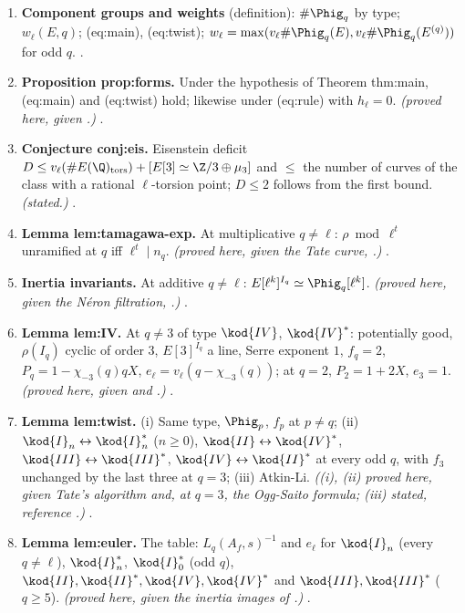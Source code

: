 \begin{sloppypar}
\begin{enumerate}[label=\textbf{\thechapter.\arabic*}]
\item \textbf{Component groups and weights} (definition): $\#\Phig_q$ by type; $w_\ell(E,q)$; (eq:main), (eq:twist); $w_\ell=\max(v_\ell\#\Phig_q(E),v_\ell\#\Phig_q(E^{(q)}))$ for odd $q$. .
\item \textbf{Proposition prop:forms.} Under the hypothesis of Theorem thm:main, (eq:main) and (eq:twist) hold; likewise under (eq:rule) with $h_\ell=0$. \emph{(proved here,
given .)} .
\item \textbf{Conjecture conj:eis.} Eisenstein deficit $D\le v_\ell(\#E(\Q)_{\mathrm{tors}})+[E[3]\simeq\Z/3\oplus\mu_3]$ and $\le$ the number of curves of the class with a rational $\ell$-torsion point;
$D\le2$ follows from the first bound. \emph{(stated.)} .
\item \textbf{Lemma lem:tamagawa-exp.} At multiplicative $q\ne\ell$: $\rho\bmod\ell^t$ unramified at $q$ iff $\ell^t\mid n_q$. \emph{(proved here, given the Tate curve, .)}
.
\item \textbf{Inertia invariants.} At additive $q\ne\ell$: $E[\ell^k]^{I_q}\simeq\Phig_q[\ell^k]$. \emph{(proved here, given the N\'eron filtration, .)} .
\item \textbf{Lemma lem:IV.} At $q\ne3$ of type $\kod{IV}$, $\kod{IV}^*$: potentially good, $\rho(I_q)$ cyclic of order $3$, $E[3]^{I_q}$ a line, Serre exponent $1$, $f_q=2$, $P_q=1-\chi_{-3}(q)qX$, $e_\ell=v_\ell(q-\chi_{-3}(q))$; at
$q=2$, $P_2=1+2X$, $e_3=1$. \emph{(proved here, given \cite{SerreTate68} and .)} .
\item \textbf{Lemma lem:twist.} (i) Same type, $\Phig_p$, $f_p$ at $p\ne q$; (ii) $\kod{I}_n\leftrightarrow\kod{I}_n^*$ ($n\ge0$), $\kod{II}\leftrightarrow\kod{IV}^*$, $\kod{III}\leftrightarrow\kod{III}^*$, $\kod{IV}\leftrightarrow\kod{II}^*$ at every odd $q$, with $f_3$
unchanged by the last three at $q=3$; (iii) Atkin-Li. \emph{((i), (ii) proved here, given Tate's algorithm and, at $q=3$, the Ogg-Saito formula; (iii) stated, reference \cite{AtkinLi78}.)}
.
\item \textbf{Lemma lem:euler.} The table: $L_q(A_f,s)^{-1}$ and $e_\ell$ for $\kod{I}_n$ (every $q\ne\ell$), $\kod{I}_n^*$, $\kod{I}_0^*$ (odd $q$), $\kod{II},\kod{II}^*,\kod{IV},\kod{IV}^*$ and $\kod{III},\kod{III}^*$ ($q\ge5$). \emph{(proved here,
given the inertia images of .)} .

\end{enumerate}
\end{sloppypar}
